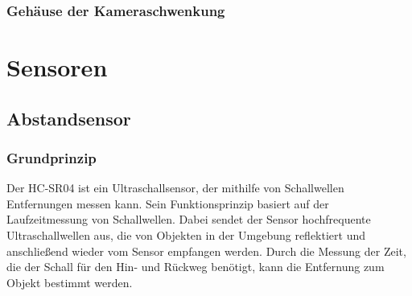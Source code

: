 \documentclass[ngerman,12pt,a4paper]{article}
\begin{document}
				\subsubsection{Gehäuse der Kameraschwenkung} %
	\newpage
	\section{Sensoren}
	
		\subsection{Abstandsensor} %
		\subsubsection{Grundprinzip}
		Der HC-SR04 ist ein Ultraschallsensor, der mithilfe von Schallwellen Entfernungen messen kann. Sein Funktionsprinzip basiert auf der Laufzeitmessung von Schallwellen. Dabei sendet der Sensor hochfrequente Ultraschallwellen aus, die von Objekten in der Umgebung reflektiert und anschließend wieder vom Sensor empfangen werden. Durch die Messung der Zeit, die der Schall für den Hin- und Rückweg benötigt, kann die Entfernung zum Objekt bestimmt werden. \\[0.3cm]
\end{document}
